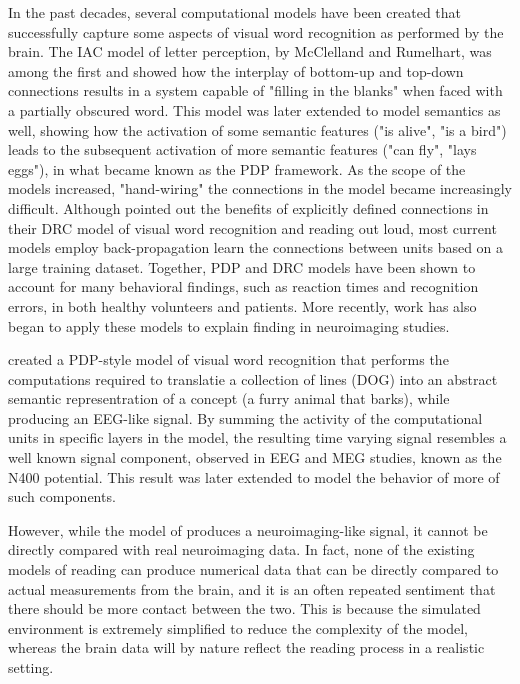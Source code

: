 \documentclass[a4paper, 10pt]{vanvliet_paper}
\newcommand{\word}[1]{\textsf{\scriptsize{}#1}}
\begin{document}
In the past decades, several computational models have been created that successfully capture some aspects of visual word recognition as performed by the brain.
The \gls{IAC} model of letter perception, by McClelland and Rumelhart\cite{McClelland1981, Rumelhart1982}, was among the first and showed how the interplay of bottom-up and top-down connections results in a system capable of "filling in the blanks" when faced with a partially obscured word.
This model was later extended to model semantics as well, showing how the activation of some semantic features ("is alive", "is a bird") leads to the subsequent activation of more semantic features ("can fly", "lays eggs"), in what became known as the \gls{PDP} framework\cite{McClelland2003}.
As the scope of the models increased, "hand-wiring" the connections in the model became increasingly difficult.
Although \textcite{Coltheart2001} pointed out the benefits of explicitly defined connections in their \gls{DRC} model of visual word recognition and reading out loud, most current models employ back-propagation learn the connections between units based on a large training dataset.
Together, \gls{PDP} and \gls{DRC} models have been shown to account for many behavioral findings, such as reaction times and recognition errors, in both healthy volunteers and patients\cite{McLeod2000, McClelland2003, Perry2007}.
More recently, work has also began to apply these models to explain finding in neuroimaging studies.

\textcite{Laszlo2012} created a \gls{PDP}-style model of visual word recognition that performs the computations required to translatie a collection of lines (\word{DOG}) into an abstract semantic representration of a concept (a furry animal that barks), while producing an \gls{EEG}-like signal.
By summing the activity of the computational units in specific layers in the model, the resulting time varying signal resembles a well known signal component, observed in \gls{EEG} and \gls{MEG} studies, known as the N400 potential\cite{Kutas2011}.
This result was later extended to model the behavior of more of such components\cite{Laszlo2014}.

However, while the model of \cite{Laszlo2014} produces a neuroimaging-like signal, it cannot be directly compared with real neuroimaging data.
In fact, none of the existing models of reading can produce numerical data that can be directly compared to actual measurements from the brain, and it is an often repeated sentiment that there should be more contact between the two\cite{Carreiras2014, Laszlo2012, Laszlo2014, Poeppel2012, Taylor2013}.
This is because the simulated environment is extremely simplified to reduce the complexity of the model, whereas the brain data will by nature reflect the reading process in a realistic setting.
\end{document}
